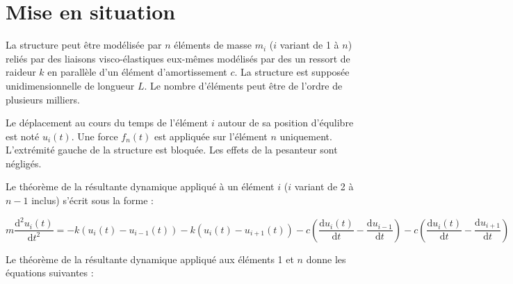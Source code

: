 \documentclass[10pt]{article}
\newif\ifxp
\begin{document}
\ifxp

\else

\fi



 \renewcommand{\baselinestretch}{1.2}
\setlength{\parskip}{2ex plus 0.5ex minus 0.2ex}



\section{Mise en situation}
La structure peut être modélisée par $n$ éléments de masse $m_i$ ($i$ variant de 1 à $n$) reliés  par des liaisons visco-élastiques eux-mêmes modélisés par des un ressort de raideur $k$ en parallèle d'un élément d'amortissement $c$. La structure est supposée unidimensionnelle de longueur $L$. Le nombre d'éléments peut être de l'ordre de plusieurs milliers. 

Le déplacement au cours du temps de l'élément $i$ autour de sa position d'équlibre est noté $u_i(t)$. Une force $f_n(t)$ est appliquée sur l'élément $n$ uniquement. L'extrémité gauche de
la structure est bloquée. Les effets de la pesanteur sont négligés.

Le théorème de la résultante dynamique appliqué à un élément $i$ ($i$ variant de 2 à $n-1$ inclus) s'écrit sous la forme : 



$$
m\dfrac{\text{d}^2u_i(t)}{\text{d}t^2} = 
- k\left(u_i(t)-u_{i-1}(t) \right)   
- k\left(u_i(t)-u_{i+1}(t) \right) 
- c\left(\dfrac{\text{d}u_i(t)}{\text{d}t}-\dfrac{\text{d}u_{i-1}}{\text{d}t} \right)   
- c\left(\dfrac{\text{d}u_i(t)}{\text{d}t}-\dfrac{\text{d}u_{i+1}}{\text{d}t} \right) 
$$

Le théorème de la résultante dynamique appliqué aux éléments 1 et $n$ donne les équations suivantes : 
%
\end{document}
